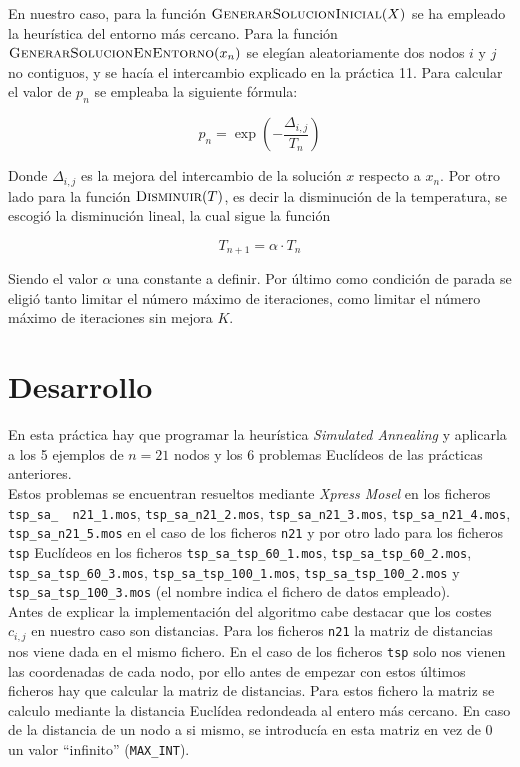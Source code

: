 \documentclass[a4paper,11pt]{article}
\begin{document}
En nuestro caso, para la función ${\Call{GenerarSolucionInicial}{X}}$ se ha empleado la heurística del entorno más cercano. Para la función ${\Call{GenerarSolucionEnEntorno}{x_{n}}}$ se elegían aleatoriamente dos nodos ${i}$ y ${j}$ no contiguos, y se hacía el intercambio explicado en la práctica 11. Para calcular el valor de ${p_{n}}$ se empleaba la siguiente fórmula:

\begin{equation}
\label{formula_p_n}
p_{n} = \exp{\left( -\frac{\Delta_{i,j}}{T_{n}} \right)}
\end{equation}

Donde ${\Delta_{i,j}}$ es la mejora del intercambio de la solución ${x}$ respecto a ${x_{n}}$. Por otro lado para la función ${\Call{Disminuir}{T}}$, es decir la disminución de la temperatura, se escogió la disminución lineal, la cual sigue la función 

\begin{equation}
\label{formula_t_n}
T_{n+1} = \alpha \cdot T_{n}
\end{equation}

Siendo el valor ${\alpha}$ una constante a definir. Por último como condición de parada se eligió tanto limitar el número máximo de iteraciones, como limitar el número máximo de iteraciones sin mejora ${K}$.


\newpage
\section{Desarrollo}
En esta práctica hay que programar la heurística \textit{Simulated Annealing} y aplicarla a los 5 ejemplos de ${n=21}$ nodos y los 6 problemas Euclídeos de las prácticas anteriores.\\

Estos problemas se encuentran resueltos mediante \textit{Xpress Mosel} en los ficheros \texttt{tsp\_sa\_ \ n21\_1.mos}, \texttt{tsp\_sa\_n21\_2.mos}, \texttt{tsp\_sa\_n21\_3.mos}, \texttt{tsp\_sa\_n21\_4.mos}, \texttt{tsp\_sa\_n21\_5.mos} en el caso de los ficheros \texttt{n21} y por otro lado para los ficheros \texttt{tsp} Euclídeos en los ficheros \texttt{tsp\_sa\_tsp\_60\_1.mos}, \texttt{tsp\_sa\_tsp\_60\_2.mos}, \texttt{tsp\_sa\_tsp\_60\_3.mos}, \texttt{tsp\_sa\_tsp\_100\_1.mos}, \texttt{tsp\_sa\_tsp\_100\_2.mos} y \texttt{tsp\_sa\_tsp\_100\_3.mos} (el nombre indica el fichero de datos empleado).\\

Antes de explicar la implementación del algoritmo cabe destacar que los costes ${c_{i,j}}$ en nuestro caso son distancias. Para los ficheros \texttt{n21} la matriz de distancias nos viene dada en el mismo fichero. En el caso de los ficheros \texttt{tsp} solo nos vienen las coordenadas de cada nodo, por ello antes de empezar con estos últimos ficheros hay que calcular la matriz de distancias. Para estos fichero la matriz se calculo mediante la distancia Euclídea redondeada al entero más cercano. En caso de la distancia de un nodo a si mismo, se introducía en esta matriz en vez de 0 un valor ``infinito'' (\texttt{MAX\_INT}).\\
\end{document}
